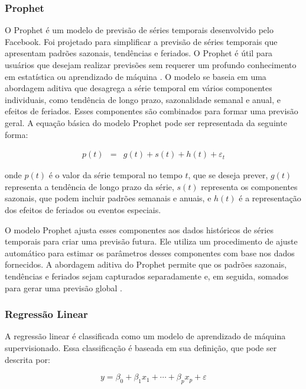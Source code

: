   \subsubsection{Prophet}
 
 O Prophet é um modelo de previsão de séries temporais desenvolvido pelo Facebook. Foi projetado para simplificar a previsão de séries temporais que apresentam padrões sazonais, tendências e feriados. O Prophet é útil para usuários que desejam realizar previsões sem requerer um profundo conhecimento em estatística ou aprendizado de máquina \cite{en16031371}. O modelo se baseia em uma abordagem aditiva que desagrega a série temporal em vários componentes individuais, como tendência de longo prazo, sazonalidade semanal e anual, e efeitos de feriados. Esses componentes são combinados para formar uma previsão geral.  A equação básica do modelo Prophet pode ser representada da seguinte forma:
 
 \begin{eqnarray}
 	p(t) &=& g(t) + s(t) + h(t) + \varepsilon_t 
 \end{eqnarray}
 
 \noindent onde $ p(t) $ é o valor da série temporal no tempo $ t $, que se deseja prever, $ g(t) $ representa a tendência de longo prazo da série, $ s(t) $ representa os componentes sazonais, que podem incluir padrões semanais e anuais, e $ h(t) $ é a representação dos efeitos de feriados ou eventos especiais.
  
 O modelo Prophet ajusta esses componentes aos dados históricos de séries temporais para criar uma previsão futura. Ele utiliza um procedimento de ajuste automático para estimar os parâmetros desses componentes com base nos dados fornecidos. A abordagem aditiva do Prophet permite que os padrões sazonais, tendências e feriados sejam capturados separadamente e, em seguida, somados para gerar uma previsão global \cite{2-s2.0-85092514286}.
 
 
 \subsubsection{Regress\~ao Linear}
 
A regressão linear é classificada como um modelo de aprendizado de máquina supervisionado. Essa classificação é baseada em sua definição, que pode ser descrita por:
 
 \begin{equation}
 	y = \beta_0 + \beta_1 x_1 + \cdots + \beta_p x_p + \varepsilon \label{eq:lr}
 \end{equation}
 
